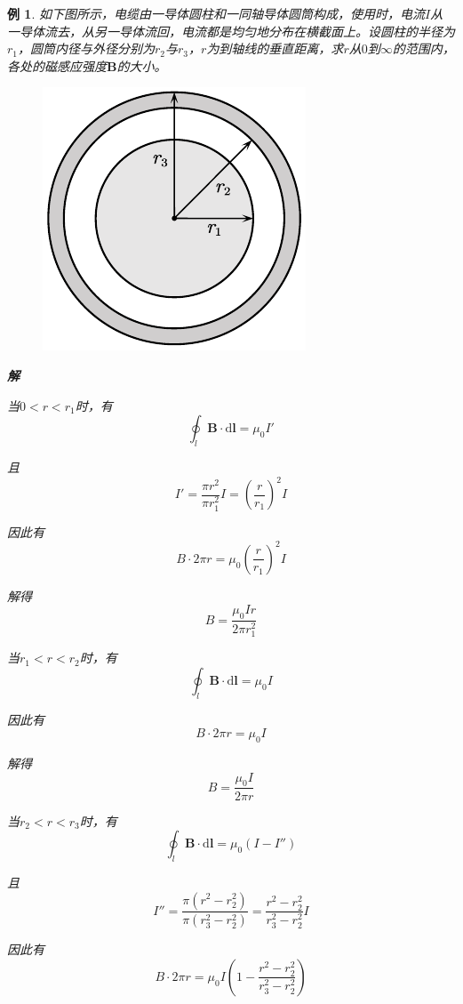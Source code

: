 \documentclass[12pt, a4paper, twoside]{ctexbook}
\newtheorem{example}[theorem]{例}
\begin{document}
\begin{example}
    如下图所示，电缆由一导体圆柱和一同轴导体圆筒构成，使用时，电流$I$从一导体流去，从另一导体流回，电流都是均匀地分布在横截面上。设圆柱的半径为$r_1$，圆筒内径与外径分别为$r_2$与$r_3$，$r$为到轴线的垂直距离，求$r$从$0$到$\infty$的范围内，各处的磁感应强度$\boldsymbol{B}$的大小。
    \begin{figure}[H]
        \centerline{\includegraphics[scale=0.92]{CH10EX05.pdf}}
    \end{figure}

    \noindent\textbf{解}

    当$0<r<r_1$时，有
    $$
    \oint_l\boldsymbol{B}\cdot\mathrm{d}\boldsymbol{l}=\mu_0 I'
    $$

    且
    $$
    I'=\frac{\pi r^2}{\pi r_1^2}I=\left(\frac{r}{r_1}\right)^2I
    $$
    
    因此有
    $$
    B\cdot 2\pi r=\mu_0\left(\frac{r}{r_1}\right)^2I
    $$

    解得
    $$
    B=\frac{\mu_0 I r}{2\pi r_1^2}
    $$

    当$r_1<r<r_2$时，有
    $$
    \oint_l\boldsymbol{B}\cdot\mathrm{d}\boldsymbol{l}=\mu_0 I
    $$
    
    因此有
    $$
    B\cdot 2\pi r=\mu_0 I
    $$

    解得
    $$
    B=\frac{\mu_0 I}{2\pi r}
    $$

    当$r_2<r<r_3$时，有
    $$
    \oint_l\boldsymbol{B}\cdot\mathrm{d}\boldsymbol{l}=\mu_0 \left(I-I''\right)
    $$

    且
    $$
    I''=\frac{\pi\left(r^2-r_2^2\right)}{\pi\left(r_3^2-r_2^2\right)}=\frac{r^2-r_2^2}{r_3^2-r_2^2}I
    $$

    因此有
    $$
    B\cdot 2\pi r=\mu_0 I\left(1-\frac{r^2-r_2^2}{r_3^2-r_2^2}\right)
    $$


\end{example}
\end{document}
